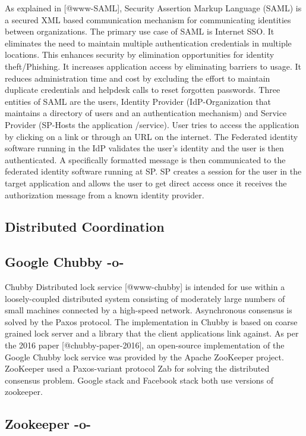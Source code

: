 As explained in [@www-SAML], Security Assertion Markup Language
(SAML) is a secured XML based communication mechanism for
communicating identities between organizations. The primary use case
of SAML is Internet SSO. It eliminates the need to maintain multiple
authentication credentials in multiple locations. This enhances
security by elimination opportunities for identity theft/Phishing. It
increases application access by eliminating barriers to usage. It
reduces administration time and cost by excluding the effort to
maintain duplicate credentials and helpdesk calls to reset forgotten
passwords. Three entities of SAML are the users, Identity Provider
(IdP-Organization that maintains a directory of users and an
authentication mechanism) and Service Provider (SP-Hosts the
application /service). User tries to access the application by
clicking on a link or through an URL on the internet. The Federated
identity software running in the IdP validates the user's identity and
the user is then authenticated. A specifically formatted message is
then communicated to the federated identity software running at SP. SP
creates a session for the user in the target application and allows
the user to get direct access once it receives the authorization
message from a known identity provider.

\subsection{Distributed Coordination}


\subsection{Google Chubby -o-}

Chubby Distributed lock service [@www-chubby] is intended for use
within a loosely-coupled distributed system consisting of moderately
large numbers of small machines connected by a high-speed
network. Asynchronous consensus is solved by the Paxos protocol. The
implementation in Chubby is based on coarse grained lock server and a
library that the client applications link against.  As per the 2016
paper [@chubby-paper-2016], an open-source implementation of the
Google Chubby lock service was provided by the Apache ZooKeeper
project. ZooKeeper used a Paxos-variant protocol Zab for solving the
distributed consensus problem.  Google stack and Facebook stack both
use versions of zookeeper.
     
\subsection{Zookeeper -o-}
 
